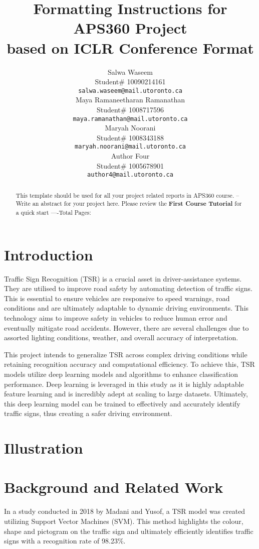 \documentclass{article} %
\title{Formatting Instructions for APS360 Project  \\ 
based on ICLR Conference Format}
\author{Salwa Waseem  \\
Student\# 10090214161\\
\texttt{salwa.waseem@mail.utoronto.ca} \\
\And
Maya Ramaneetharan Ramanathan  \\
Student\# 1008717596 \\
\texttt{maya.ramanathan@mail.utoronto.ca} \\
\AND
Maryah Noorani  \\
Student\# 1008343188 \\
\texttt{maryah.noorani@mail.utoronto.ca} \\
\And
Author Four \\
Student\# 1005678901 \\
\texttt{author4@mail.utoronto.ca} \\
\AND
}
\begin{document}
\maketitle

\begin{abstract}
This template should be used for all your project related reports in APS360 course. -- Write an abstract for your project here. Please review the \textbf{ First Course Tutorial} for a quick start
----Total Pages: \pageref{last_page}
\end{abstract}



\section{Introduction }

Traffic Sign Recognition (TSR) is a crucial asset in driver-assistance systems. They are utilised to improve road safety by automating detection of traffic signs. This is essential to ensure vehicles are responsive to speed warnings, road conditions and are ultimately adaptable to dynamic driving environments. This technology aims to improve safety in vehicles to reduce human error and eventually mitigate road accidents. However, there are several challenges due to assorted lighting conditions, weather, and overall accuracy of interpretation. 

This project intends to generalize TSR across complex driving conditions while retaining recognition accuracy and computational efficiency. To achieve this, TSR models utilize deep learning models and algorithms to enhance classification performance. Deep learning is leveraged in this study as it is highly adaptable feature learning and is incredibly adept at scaling to large datasets. Ultimately, this deep learning model can be trained to effectively and accurately identify traffic signs, thus creating a safer driving environment. 

\section{Illustration}
\label{gen_inst}

\section{Background and Related Work}
\label{headings}
In a study conducted in 2018 by Madani and Yusof, a TSR model was created utilizing Support Vector Machines (SVM). This method highlights the colour, shape and pictogram on the traffic sign and ultimately efficiently identifies traffic signs with a recognition rate of 98.23\%. 
\end{document}
